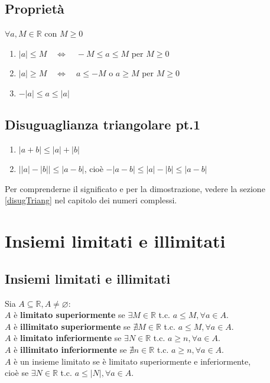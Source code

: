 \documentclass[a4paper]{article}
\begin{document}
\subsection{Proprietà}
\(\forall a, M \in \mathbb{R}\) con \(M \geq 0\)
\begin{enumerate}
	\item \(\left| a \right| \leq M \quad \Leftrightarrow \quad -M \leq a \leq M\) per \(M \geq 0\)
	\item \(\left| a \right| \geq M \quad \Leftrightarrow \quad a \leq -M\) o \(a \geq M\) per \(M \geq 0\)
	\item \(- \left| a \right| \leq a \leq \left| a \right|\)
\end{enumerate}

\subsection{Disuguaglianza triangolare pt.1}
\begin{enumerate}
	\item \(\left| a + b \right| \leq \left| a \right| + \left| b \right|\)
	\item \(\left| \left| a \right| - \left| b \right| \right| \leq \left| a - b \right|\), cioè
	\(- \left| a - b \right| \leq \left| a \right| - \left| b \right| \leq \left| a - b \right|\)
\end{enumerate}
Per comprenderne il significato e per la dimostrazione, vedere la sezione \ref{disugTriang} nel capitolo dei numeri complessi.

\newpage


\section{Insiemi limitati e illimitati}
\subsection{Insiemi limitati e illimitati}
Sia \(A \subseteq \mathbb{R}, A \neq \varnothing\): \\
\(A\) è \textbf{limitato superiormente} se \(\exists M \in \mathbb{R}\) t.c. \(a \leq M, \forall a \in A\). \\
\(A\) è \textbf{illimitato superiormente} se \(\nexists M \in \mathbb{R}\) t.c. \(a \leq M, \forall a \in A\). \\
\(A\) è \textbf{limitato inferiormente} se \(\exists N \in \mathbb{R}\) t.c. \(a \geq n, \forall a \in A\). \\
\(A\) è \textbf{illimitato inferiormente} se \(\nexists n \in \mathbb{R}\) t.c. \(a \geq n, \forall a \in A\). \\
\(A\) è un insieme limitato se è limitato superiormente e inferiormente,\\cioè se \(\exists N \in \mathbb{R}\) t.c. \(a \leq \left| N \right|, \forall a \in A\).
\end{document}
